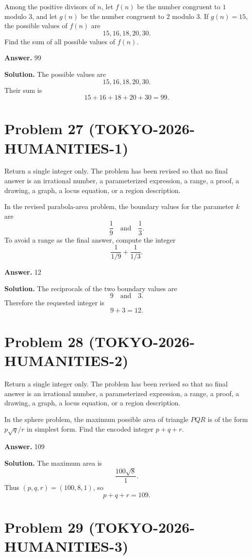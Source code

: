 \documentclass[11pt]{article}
\begin{document}
Among the positive divisors of \(n\), let \(f(n)\) be the number congruent to
\(1\) modulo \(3\), and let \(g(n)\) be the number congruent to \(2\) modulo
\(3\). If \(g(n)=15\), the possible values of \(f(n)\) are
\[
15,
16,
18,
20,
30.
\]
Find the sum of all possible values of \(f(n)\).


\textbf{Answer.} 99


\textbf{Solution.}
The possible values are
\[
15,16,18,20,30.
\]
Their sum is
\[
15+16+18+20+30=99.
\]


\section*{Problem 27 (TOKYO-2026-HUMANITIES-1)}

Return a single integer only. The problem has been revised so that no final answer is an irrational number, a parameterized expression, a range, a proof, a drawing, a graph, a locus equation, or a region description.

In the revised parabola-area problem, the boundary values for the parameter
\(k\) are
\[
\frac19 \quad\text{and}\quad \frac13.
\]
To avoid a range as the final answer, compute the integer
\[
\frac{1}{1/9}+\frac{1}{1/3}.
\]


\textbf{Answer.} 12


\textbf{Solution.}
The reciprocals of the two boundary values are
\[
9 \quad\text{and}\quad 3.
\]
Therefore the requested integer is
\[
9+3=12.
\]


\section*{Problem 28 (TOKYO-2026-HUMANITIES-2)}

Return a single integer only. The problem has been revised so that no final answer is an irrational number, a parameterized expression, a range, a proof, a drawing, a graph, a locus equation, or a region description.

In the sphere problem, the maximum possible area of triangle \(PQR\) is of the
form \(p\sqrt q/r\) in simplest form. Find the encoded integer \(p+q+r\).


\textbf{Answer.} 109


\textbf{Solution.}
The maximum area is
\[
\frac{100\sqrt8}{1}.
\]
Thus \((p,q,r)=(100,8,1)\), so
\[
p+q+r=109.
\]


\section*{Problem 29 (TOKYO-2026-HUMANITIES-3)}
\end{document}

